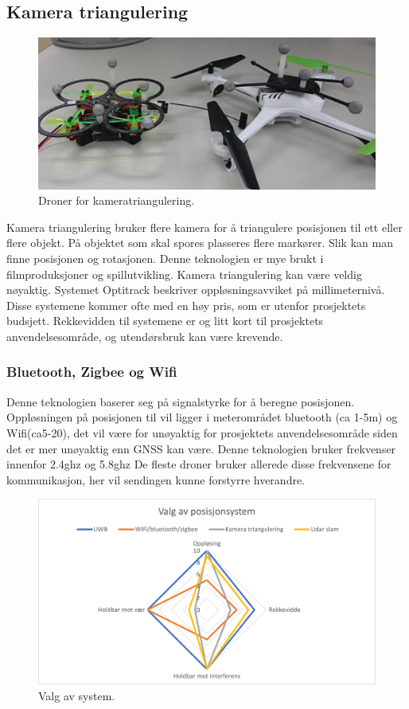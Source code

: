 \subsection{Kamera triangulering}

\begin{figure}[htp]
    \centering
    \includegraphics[width=0.7\columnwidth]{figures/kameratriangulering}
    \caption{Droner for kameratriangulering.}
    \label{fig:kameratriangulering}
\end{figure}

Kamera triangulering bruker flere kamera for å triangulere posisjonen til ett eller flere objekt. På objektet som skal spores plasseres flere markører. Slik kan man finne posisjonen og rotasjonen. Denne teknologien er mye brukt i filmproduksjoner og spillutvikling.
Kamera triangulering kan være veldig nøyaktig. Systemet Optitrack beskriver oppløsningsavviket på millimeternivå.  Disse systemene kommer ofte med en høy pris, som er utenfor prosjektets budsjett. Rekkevidden til systemene er og litt kort til prosjektets anvendelsesområde, og utendørsbruk kan være krevende. 

\subsubsection{Bluetooth, Zigbee og Wifi}
Denne teknologien baserer seg på signalstyrke for å beregne posisjonen. Oppløsningen på posisjonen til vil ligger i meterområdet bluetooth (ca 1-5m) og Wifi(ca5-20), det vil være for unøyaktig for prosjektets anvendelsesområde siden det er mer unøyaktig enn GNSS kan være. 
Denne teknologien bruker frekvenser innenfor 2.4ghz og 5.8ghz De fleste droner bruker allerede disse frekvensene for kommunikasjon, her vil sendingen kunne forstyrre hverandre.  

\begin{figure}[htp]
    \centering
    \includegraphics[width=0.7\columnwidth]{figures/valgavsystem}
    \caption{Valg av system.}
    \label{fig:valgavsystem}
\end{figure}

